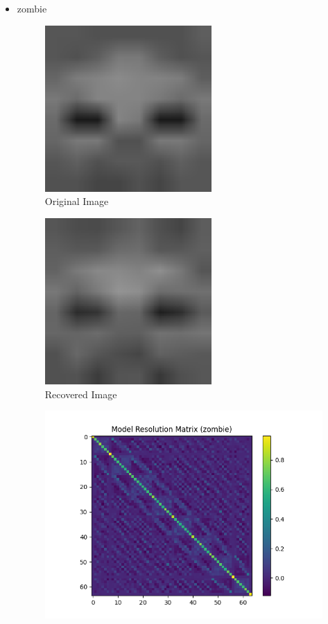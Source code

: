 \documentclass{article}
\begin{document}
\begin{itemize}
    \item zombie
\begin{figure}[h]
    \centering
    \includegraphics[width=0.6\textwidth]{images/greyscale/zombie.png}
    \caption{Original Image}
\end{figure}
\begin{figure}[h]
    \centering
    \includegraphics[width=0.6\textwidth]{images/outputs/zombie.png}
    \caption{Recovered Image}
\end{figure}
\begin{figure}[h]
    \centering
    \includegraphics[width=1\textwidth]{images/outputs/modelres/zombie.png}

\end{figure}
\end{itemize}
\end{document}
